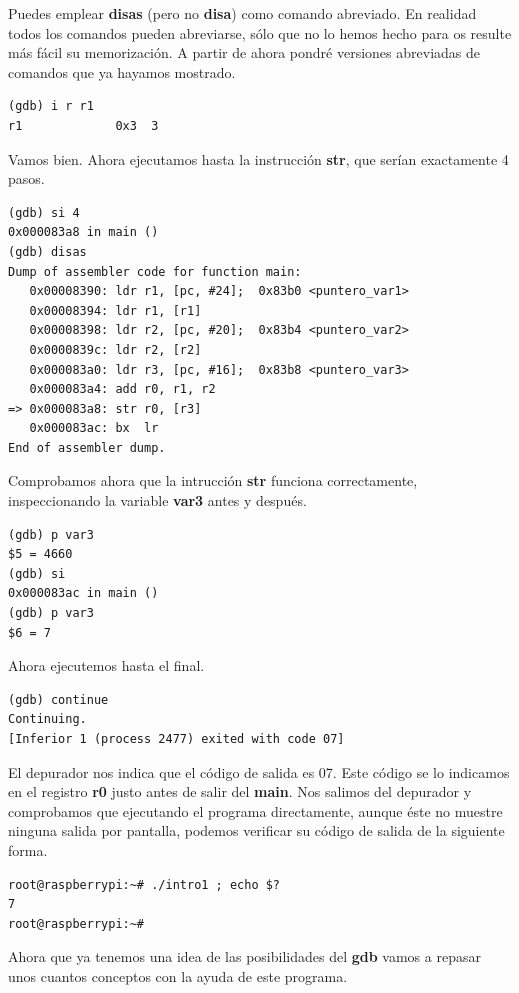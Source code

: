 Puedes emplear {\bf disas} (pero no {\bf disa}) como comando
abreviado. En realidad todos los comandos pueden abreviarse, sólo
que no lo hemos hecho para os resulte más fácil su memorización.
A partir de ahora pondré versiones abreviadas de comandos que ya
hayamos mostrado.

\begin{lstlisting}
(gdb) i r r1
r1             0x3  3
\end{lstlisting}

Vamos bien. Ahora ejecutamos hasta la instrucción {\bf str}, que
serían exactamente 4 pasos.

\begin{lstlisting}
(gdb) si 4
0x000083a8 in main ()
(gdb) disas
Dump of assembler code for function main:
   0x00008390: ldr r1, [pc, #24];  0x83b0 <puntero_var1>
   0x00008394: ldr r1, [r1]
   0x00008398: ldr r2, [pc, #20];  0x83b4 <puntero_var2>
   0x0000839c: ldr r2, [r2]
   0x000083a0: ldr r3, [pc, #16];  0x83b8 <puntero_var3>
   0x000083a4: add r0, r1, r2
=> 0x000083a8: str r0, [r3]
   0x000083ac: bx  lr
End of assembler dump.
\end{lstlisting}

Comprobamos ahora que la intrucción {\bf str} funciona correctamente,
inspeccionando la variable {\bf var3} antes y después.

\begin{lstlisting}
(gdb) p var3
$5 = 4660
(gdb) si
0x000083ac in main ()
(gdb) p var3
$6 = 7
\end{lstlisting}

Ahora ejecutemos hasta el final.

\begin{lstlisting}
(gdb) continue
Continuing.
[Inferior 1 (process 2477) exited with code 07]
\end{lstlisting}

El depurador nos indica que el código de salida es 07. Este código
se lo indicamos en el registro {\bf r0} justo antes de salir del {\bf main}.
Nos salimos del depurador y comprobamos que ejecutando el programa
directamente, aunque éste no muestre ninguna salida por pantalla, podemos
verificar su código de salida de la siguiente forma.

\begin{lstlisting}
root@raspberrypi:~# ./intro1 ; echo $?
7
root@raspberrypi:~#
\end{lstlisting}

Ahora que ya tenemos una idea de las posibilidades del {\bf gdb}
vamos a repasar unos cuantos conceptos con la ayuda de este programa.

